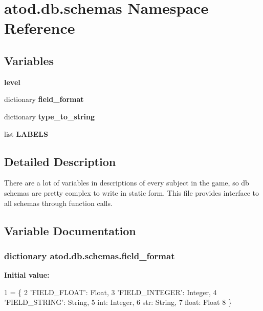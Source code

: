 \hypertarget{namespaceatod_1_1db_1_1schemas}{}\section{atod.\+db.\+schemas Namespace Reference}
\label{namespaceatod_1_1db_1_1schemas}
\subsection*{Variables}
\begin{DoxyCompactItemize}
\item 
{\bfseries level}\hypertarget{namespaceatod_1_1db_1_1schemas_a4a7ea01e71903882d0dd27d6090d429c}{}\label{namespaceatod_1_1db_1_1schemas_a4a7ea01e71903882d0dd27d6090d429c}

\item 
dictionary {\bfseries field\+\_\+format}
\item 
dictionary {\bfseries type\+\_\+to\+\_\+string}
\item 
list {\bfseries L\+A\+B\+E\+LS}
\end{DoxyCompactItemize}


\subsection{Detailed Description}
\begin{DoxyVerb}There are a lot of variables in descriptions of every subject in the
game, so db schemas are pretty complex to write in static form.
This file provides interface to all schemas through function calls.
\end{DoxyVerb}
 

\subsection{Variable Documentation}
\subsubsection[{\texorpdfstring{field\+\_\+format}{field\_format}}]{\setlength{\rightskip}{0pt plus 5cm}dictionary atod.\+db.\+schemas.\+field\+\_\+format}\hypertarget{namespaceatod_1_1db_1_1schemas_a7f12079a3333d78633ae8abf845e7627}{}\label{namespaceatod_1_1db_1_1schemas_a7f12079a3333d78633ae8abf845e7627}
{\bfseries Initial value\+:}
\begin{DoxyCode}
1 = \{
2     \textcolor{stringliteral}{'FIELD\_FLOAT'}: Float,
3     \textcolor{stringliteral}{'FIELD\_INTEGER'}: Integer,
4     \textcolor{stringliteral}{'FIELD\_STRING'}: String,
5     int: Integer,
6     str: String,
7     float: Float
8 \}
\end{DoxyCode}
